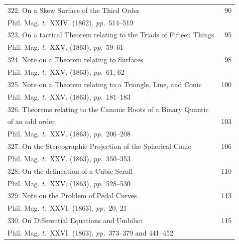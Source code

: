 \documentclass[11pt,a4paper]{article}
\newcommand{\tome}{\textit{t.}}
\newcommand{\pages}{\textit{pp.}}
\begin{document}
\begin{longtable}{p{4.5in}r}
322. On a Skew Surface of the Third Order & 90 \\[-0.3em]
\multicolumn{2}{l}{\quad\small Phil. Mag. \tome~XXIV. (1862), \pages~514--519} \\[0.5em]

323. On a tactical Theorem relating to the Triads of Fifteen Things & 95 \\[-0.3em]
\multicolumn{2}{l}{\quad\small Phil. Mag. \tome~XXV. (1863), \pages~59--61} \\[0.5em]

324. Note on a Theorem relating to Surfaces & 98 \\[-0.3em]
\multicolumn{2}{l}{\quad\small Phil. Mag. \tome~XXV. (1863), \pages~61, 62} \\[0.5em]

325. Note on a Theorem relating to a Triangle, Line, and Conic & 100 \\[-0.3em]
\multicolumn{2}{l}{\quad\small Phil. Mag. \tome~XXV. (1863), \pages~181--183} \\[0.5em]

\multicolumn{2}{l}{326. Theorems relating to the Canonic Roots of a Binary Quantic} \\[-0.3em]
\quad of an odd order & 103 \\[-0.3em]
\multicolumn{2}{l}{\quad\small Phil. Mag. \tome~XXV. (1863), \pages~206--208} \\[0.5em]

327. On the Stereographic Projection of the Spherical Conic & 106 \\[-0.3em]
\multicolumn{2}{l}{\quad\small Phil. Mag. \tome~XXV. (1863), \pages~350--353} \\[0.5em]

328. On the delineation of a Cubic Scroll & 110 \\[-0.3em]
\multicolumn{2}{l}{\quad\small Phil. Mag. \tome~XXV. (1863), \pages~528--530} \\[0.5em]

329. Note on the Problem of Pedal Curves & 113 \\[-0.3em]
\multicolumn{2}{l}{\quad\small Phil. Mag. \tome~XXVI. (1863), \pages~20, 21} \\[0.5em]

330. On Differential Equations and Umbilici & 115 \\[-0.3em]
\multicolumn{2}{l}{\quad\small Phil. Mag. \tome~XXVI. (1863), \pages~373--379 and 441--452} \\[0.5em]


\end{longtable}
\end{document}
